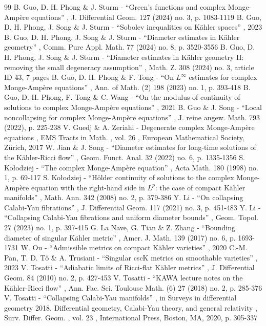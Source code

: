 \documentclass[11pt]{article}
\numberwithin{equation}{section}
\theoremstyle{definition}
\begin{document}
\begin{thebibliography}{99}
 B. Guo, D. H. Phong \& J. Sturm - “Green’s functions and complex Monge-Ampère equations” , J. Differential Geom. 127 (2024) no. 3, p. 1083-1119
 B. Guo, D. H. Phong, J. Song \& J. Sturm - “Sobolev inequalities on Kähler spaces” , 2023
 B. Guo, D. H. Phong, J. Song \& J. Sturm - “Diameter estimates in Kähler geometry” , Comm. Pure Appl. Math. 77 (2024) no. 8, p. 3520-3556
 B. Guo, D. H. Phong, J. Song \& J. Sturm - “Diameter estimates in Kähler geometry II: removing the small degeneracy assumption” , Math. Z. 308 (2024) no. 3, article ID 43, 7 pages
 B. Guo, D. H. Phong \& F. Tong - “On $L^\infty $ estimates for complex Monge-Ampère equations” , Ann. of Math. (2) 198 (2023) no. 1, p. 393-418
 B. Guo, D. H. Phong, F. Tong \& C. Wang - “On the modulus of continuity of solutions to complex Monge-Ampère equations” , 2021
 B. Guo \& J. Song - “Local noncollapsing for complex Monge-Ampère equations” , J. reine angew. Math. 793 (2022), p. 225-238
 V. Guedj \& A. Zeriahi - Degenerate complex Monge-Ampère equations , EMS Tracts in Math. , vol. 26 , European Mathematical Society, Zürich, 2017
 W. Jian \& J. Song - “Diameter estimates for long-time solutions of the Kähler-Ricci flow” , Geom. Funct. Anal. 32 (2022) no. 6, p. 1335-1356
 S. Kołodziej - “The complex Monge-Ampère equation” , Acta Math. 180 (1998) no. 1, p. 69-117
 S. Kołodziej - “Hölder continuity of solutions to the complex Monge-Ampère equation with the right-hand side in $L^p$: the case of compact Kähler manifolds” , Math. Ann. 342 (2008) no. 2, p. 379-386
 Y. Li - “On collapsing Calabi-Yau fibrations” , J. Differential Geom. 117 (2021) no. 3, p. 451-483
 Y. Li - “Collapsing Calabi-Yau fibrations and uniform diameter bounds” , Geom. Topol. 27 (2023) no. 1, p. 397-415
 G. La Nave, G. Tian \& Z. Zhang - “Bounding diameter of singular Kähler metric” , Amer. J. Math. 139 (2017) no. 6, p. 1693-1731
 W. Ou - “Admissible metrics on compact Kähler varieties” , 2020
 C.-M. Pan, T. D. Tô \& A. Trusiani - “Singular cscK metrics on smoothable varieties” , 2023
 V. Tosatti - “Adiabatic limits of Ricci-flat Kähler metrics” , J. Differential Geom. 84 (2010) no. 2, p. 427-453
 V. Tosatti - “KAWA lecture notes on the Kähler-Ricci flow” , Ann. Fac. Sci. Toulouse Math. (6) 27 (2018) no. 2, p. 285-376
 V. Tosatti - “Collapsing Calabi-Yau manifolds” , in Surveys in differential geometry 2018. Differential geometry, Calabi-Yau theory, and general relativity , Surv. Differ. Geom. , vol. 23 , International Press, Boston, MA, 2020, p. 305-337

\end{thebibliography}
\end{document}
